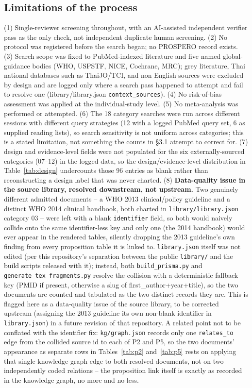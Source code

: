 \documentclass[11pt]{article}
\begin{document}
\subsection{Limitations of the process}
(1) Single-reviewer screening throughout, with an AI-assisted independent verifier pass as the
only check, not independent duplicate human screening. (2) No protocol was registered before the
search began; no PROSPERO record exists. (3) Search scope was fixed to PubMed-indexed literature
and five named global-guidance bodies (WHO, USPSTF, NICE, Cochrane, MRC); grey literature, Thai
national databases such as ThaiJO/TCI, and non-English sources were excluded by design and are
logged only where a search pass happened to attempt and fail to resolve one (library/library.json
\texttt{context\_sources}). (4) No risk-of-bias assessment was applied at the individual-study
level. (5) No meta-analysis was performed or attempted. (6) The 18 category searches were run
across different sessions with different query strategies (12 with a logged PubMed query set, 6 as
supplied reading lists), so search sensitivity is not uniform across categories; this is a stated
limitation, not something the counts in \S3.1 attempt to correct for. (7) design and
evidence-level fields were not populated for the six externally-sourced categories
(07--12) in the logged data, so the design/evidence-level distribution in Table~\ref{tab:design}
undercounts those 96 entries as blank rather than reconstructing a design label that was never
charted. (8) \textbf{Data-quality issue in the source library, resolved downstream, not upstream.}
Two genuinely different admitted documents -- a WHO 2013 clinical/policy guideline and a distinct
WHO 2014 clinical handbook, both charted in \texttt{library/library.json} category 03 -- were left
with a blank \texttt{identifier} field, so both would naively collide onto the same
identifier-less key and only one (the 2014 handbook) would ever appear in the rendered tables,
silently dropping the 2013 guideline's own finding from every proposition table it is linked to.
\texttt{library.json} itself was not edited (per this repository's separation between the public
\texttt{library/} and the build scripts released with it); instead, both \texttt{build\_prisma.py}
and \texttt{generate\_tex\_fragments.py} resolve the collision with a deterministic fallback key
(PMID if present, otherwise a slug of first\_author+year+title), so the two documents are counted
and tabulated as the two distinct records they are. This is flagged here as a data-quality issue
of the source library, to be corrected upstream (assigning the 2013 guideline its own non-blank
identifier in \texttt{library.json}) in a future revision of that repository. A related point not
to be conflated with the identifier fix: \texttt{kg/graph.json} records only one
\texttt{relates\_to} edge from the collided source id to each of P2 and P5, so the two documents'
appearance as separate rows in Tables~\ref{tab:p2} and~\ref{tab:p5} rests on applying that single
knowledge-graph edge to both resolved documents, not on two independently coded relations -- the
proposition link itself is exactly as recorded in the knowledge graph, no more and no less.
\end{document}
